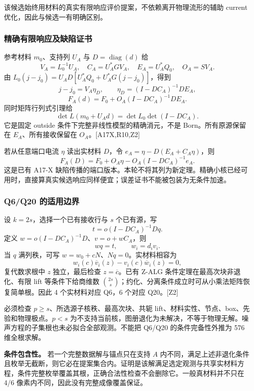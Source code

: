 \documentclass[10pt,a4paper]{article}
\begin{document}
该候选始终用材料的真实有限响应评价提案，不依赖离开物理流形的辅助 current
优化，因此与候选一有明确区别。

\hypertarget{ux7cbeux786eux6709ux9650ux54cdux5e94ux53caux7f3aux9677ux8bc1ux4e66}{%
\subsubsection{精确有限响应及缺陷证书}\label{ux7cbeux786eux6709ux9650ux54cdux5e94ux53caux7f3aux9677ux8bc1ux4e66}}

参考材料 \(m_0\)、支持列 \(U_A\) 与 \(D=\operatorname{diag}(d)\) 给
\[V_A=L_0^{-1}U_A,\quad C_A=U_A^*GV_A,\quad
E_A=U_A^*Q_0,\quad O_A=SV_A.\] 由
\(L_0(j-j_0)=U_AD[U_A^*Q_0+U_A^*G(j-j_0)]\)，得到
\[j-j_0=V_A\eta_D,\qquad \eta_D=(I-DC_A)^{-1}DE_A,\]
\[\boxed{F_A(d)=F_0+O_A(I-DC_A)^{-1}DE_A.}\] 同时矩阵行列式引理给
\[\det L(m_0+U_Ad)=\det L_0\det(I-DC_A).\] 它是固定 outside
条件下完整非线性模型的精确消元，不是 Born。所有原源保留在
\(E_A\)、所有接收保留在 \(O_A\)。{[}A17X,R10,Z2{]}

若从任意端口电流 \(\eta\) 读出实材料 \(D\)，令
\(e_A=\eta-D(E_A+C_A\eta)\)，则
\[F_A(D)=F_0+O_A\eta-O_A(I-DC_A)^{-1}e_A.\] 这是已有 A17-X
缺陷传播的端口版本。本轮不将其列为新定理。精确小核已经可用时，直接算真实候选响应同样便宜；误差证书不能被包装为无条件加速。

\hypertarget{q6q20-ux7684ux9002ux7528ux8fb9ux754c}{%
\subsubsection{Q6/Q20
的适用边界}\label{q6q20-ux7684ux9002ux7528ux8fb9ux754c}}

设 \(k=2s\)，选择一个已有接收行与 \(s\) 个已有源，写
\[t=o(I-DC_A)^{-1}Dq.\] 定义 \(w=o(I-DC_A)^{-1}D\)、\(v=o+wC_A\)，则
\[wq=t,\qquad w_i=d_iv_i.\] 当 \(q\) 满列秩，可写
\(w=w_0+cN\)、\(Nq=0\)。实材料相容为
\[w_i(c)\overline v_i(z)-v_i(c)\overline w_i(z)=0,\] 复代数求根中 \(z\)
独立，最后检查 \(z=\overline c\)。已有 Z-ALG
条件定理在最高次块非退化、有限 lift 等条件下给商维数
\(\binom{2s}{s}\)；约化、分离条件成立时可从小乘法矩阵恢复简单根。因此 4
个实材料对应 Q6，6 个对应 Q20。{[}Z2{]}

必须检查 \(p\ge s\)、所选源子核秩、最高次块、共轭
lift、材料实性、节点、box、先验和物理极点。\(p<s\)
为不支持当前核，图册退化为未解决，不等于物理无解。噪声方程的子集根也未必拟合全部观测。不能把
Q6/Q20 的条件完备性外推为 576 维全根求解。

\textbf{条件包含性。} 若一个完整数据解与锚点只在支持 \(A\)
内不同，满足上述非退化条件且枚举无截断，则它必在提案集合内。证明是该解满足选定观测与共享实材料方程，条件完整枚举覆盖其根，正确合法性检查不会删除它。一般真材料并不只在
4/6 像素内不同，因此没有完整成像覆盖保证。
\end{document}
